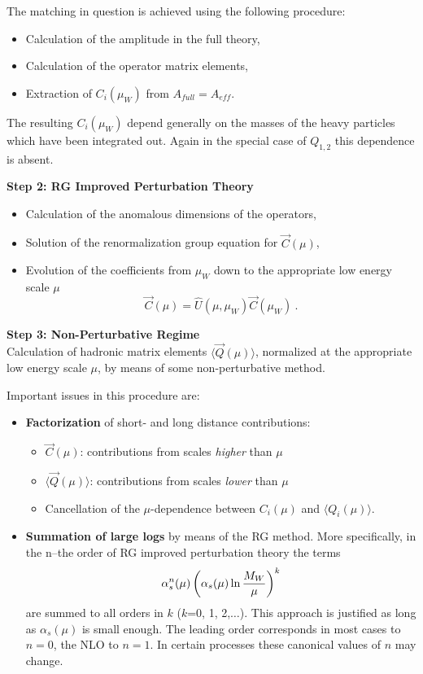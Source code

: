\documentclass[12pt]{article}
\def\as{\alpha_s}
\begin{document}
\begin{itemize}
\begin{itemize}
\begin{itemize}
The matching in question is achieved using the following procedure:

\begin{itemize}
\item
Calculation of the amplitude in the full theory,
\item
Calculation of the operator matrix elements,
\item
Extraction of $C_i(\mu_W)$ from $A_{full}=A_{eff}$.
\end{itemize}
The resulting $C_i(\mu_W)$ depend generally on the masses of the
heavy particles which have been integrated out. Again in the
special case of $Q_{1,2}$ this dependence is absent.

\noindent
{\bf Step 2: RG Improved Perturbation Theory}
\begin{itemize}
\item Calculation of the anomalous dimensions of the operators,
\item Solution of the renormalization group equation for $\vec{C}(\mu)$,
\item Evolution of the coefficients from $\mu_W$ down to the
appropriate low energy scale $\mu$
\begin{displaymath}
\vec C(\mu)=\hat U(\mu, \mu_W)\vec C(\mu_W)~.
\end{displaymath}
\end{itemize}

\medskip
\noindent
{\bf Step 3: Non-Perturbative Regime}
\\
Calculation of hadronic matrix elements $\langle\vec Q(\mu)\rangle$,
normalized at the appropriate low energy scale $\mu$, by means of
some non-perturbative method.

\bigskip
\noindent
Important issues in this procedure are:
\begin{itemize}
\item {\bf Factorization\/} of short- and long
distance contributions:
\begin{itemize}
\item
 $\vec C(\mu)$: contributions from scales {\it higher} than $\mu$
\item 
$\langle \vec Q(\mu)\rangle$: contributions from scales {\it lower}
than $\mu$
\item 
Cancellation of  the $\mu$-dependence
between $C_i(\mu)$ and
$\langle Q_i(\mu)\rangle$.
\end{itemize}
\item  {\bf Summation of large logs\/} by means of the RG method.
 More specifically, in the n--the  order of
RG improved perturbation theory the terms 
\begin{displaymath}
\as^n(\mu)
\left(\as(\mu)\ln{M_W\over\mu}\right)^k
\end{displaymath}
are summed to all orders in $k$ ($k$=0, 1, 2,$\ldots$). This approach
is justified as long as $\as(\mu)$ is small enough. The leading order
corresponds in most cases to $n=0$, the NLO to $n=1$. In certain
processes these canonical values of $n$ may change.
\end{itemize}


\end{itemize}
\end{itemize}
\end{itemize}
\end{document}
